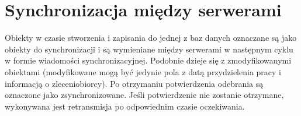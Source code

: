 \documentclass{report}
\begin{document}
\section{Synchronizacja między serwerami}
	Obiekty w czasie stworzenia i zapisania do jednej z baz danych oznaczane są jako obiekty
	do synchronizacji i są wymieniane między serwerami w następnym cyklu w formie wiadomości
	synchronizacyjnej. Podobnie dzieje się z zmodyfikowanymi obiektami (modyfikowane
	mogą być jedynie pola z datą przydzielenia pracy i informacją o zleceniobiorcy).
	Po otrzymaniu potwierdzenia odebrania są oznaczone jako zsynchronizowane. Jeśli
	potwierdzenie nie zostanie otrzymane, wykonywana jest retransmisja po odpowiednim
	czasie oczekiwania.
	
	
\end{document}
